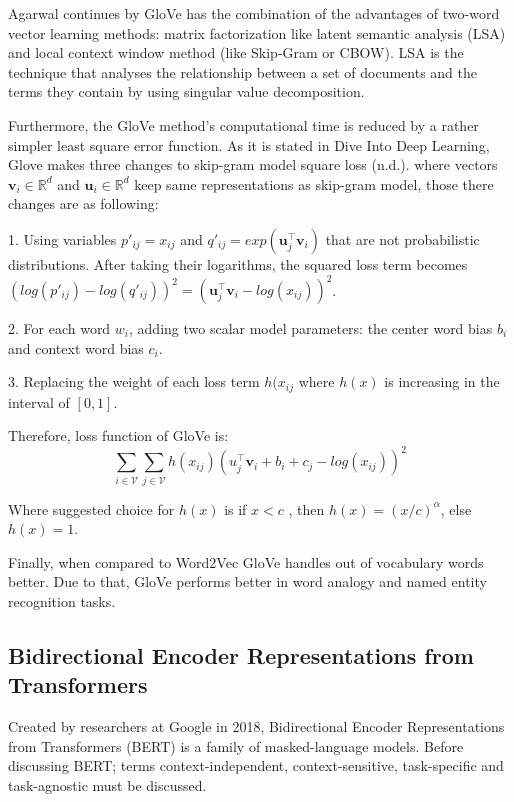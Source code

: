 \documentclass[man]{apa7}
\begin{document}
Agarwal continues by GloVe has the combination of the advantages of two-word vector learning methods: matrix factorization like latent semantic analysis (LSA) and local context window method (like Skip-Gram or CBOW). LSA is the technique that analyses the relationship between a set of documents and the terms they contain by using singular value decomposition. 

Furthermore, the GloVe method's computational time is reduced by a rather simpler least square error function. As it is stated in Dive Into Deep Learning, Glove makes three changes to skip-gram model square loss (n.d.). where vectors $\mathbf{v_\mathit{i}} \in \mathbb{R}^d$ and $\mathbf{u_\mathit{i}} \in \mathbb{R}^d$ keep same representations as skip-gram model, those there changes are as following:

1. Using variables $p'_{ij} = x_{ij}$ and $q'_{ij} = exp(\mathbf{u}_j^\top \mathbf{v}_i)$ that are not probabilistic distributions. After taking their logarithms, the squared loss term becomes $(log(p'_{ij})-log(q'_{ij}))^2 = (\mathbf{u}_j^\top \mathbf{v}_i - log (x_{ij}))^2$.

2. For each word $w_i$, adding two scalar model parameters: the center word bias $b_i$ and context word bias $c_i$.

3. Replacing the weight of each loss term $h(x_{ij}$ where $h(x)$ is increasing in the interval of $[0,1]$.
 
Therefore, loss function of GloVe is:
\begin{equation}
\sum_{i \in \mathcal{V}} \sum_{j \in \mathcal{V}} h(x_{ij})(u_j^\top \mathbf{v}_i + b_i +c_j -log(x_{ij}))^2
\end{equation}


Where suggested choice for $h(x)$ is if $x < c$ , then $h(x) = (x/c)^\alpha$, else $h(x) = 1$. 

Finally, when compared to Word2Vec GloVe handles out of vocabulary words better. Due to that, GloVe performs better in word analogy and named entity recognition tasks. 

\subsection{Bidirectional Encoder Representations from Transformers}
Created by researchers at Google in 2018, Bidirectional Encoder Representations from Transformers (BERT) is a family of masked-language models. Before discussing BERT; terms context-independent, context-sensitive, task-specific and task-agnostic must be discussed.
\end{document}
